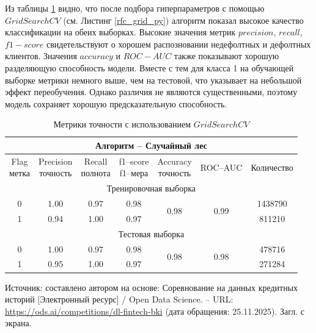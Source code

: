 Из таблицы \ref{new_rfc_gs} видно, что после подбора гиперпараметров с помощью $GridSearchCV$ (см. Листинг \ref{rfc_grid_py}) алгоритм показал высокое качество классификации на обеих выборках. Высокие значения метрик $precision$, $recall$, $f1-score$ свидетельствуют о хорошем распозновании недефолтных и дефолтных клиентов. Значения $accuracy$ и $ROC-AUC$ также показывают хорошую разделяющую способность модели. Вместе с тем для класса 1 на обучающей выборке метрики немного выше, чем на тестовой, что указывает на небольшой эффект переобучения. Однако различия не являются существенными, поэтому модель сохраняет хорошую предсказательную способность.

\begin{center}
	\begin{longtable}{|c|c|c|c|c|c|c|}
		\caption{Метрики точности с использованием $GridSearchCV$}
		\label{new_rfc_gs} \\
		\hline
		\multicolumn{7}{|c|}{Алгоритм -- Случайный лес}\\
		\hline
		\rowcolor[gray]{.9}
		\specialcell{Flag\\метка} &
		\specialcell{Precision\\точность} &
		\specialcell{Recall\\полнота} &
		\specialcell{f1--score\\f1--мера} &
		\specialcell{Accuracy\\точность}  &
		ROC--AUC &
		Количество    \\
		\hline
		\multicolumn{7}{|c|}{Тренировочная выборка}\\
		\hline
		0 & 1.00 & 0.97 & 0.98 &
		\multirow{2}{*}{0.98} &   
		\multirow{2}{*}{0.99} &  
		1438790\\                    
		\cline{1-4} \cline{7-7}
		1 & 0.94 & 1.00 & 0.97 &  
		&      & 811210 \\       
		\hline
		\multicolumn{7}{|c|}{Тестовая выборка} \\
		\hline
		0 & 1.00 & 0.97 & 0.98 &
		\multirow{2}{*}{0.98} &
		\multirow{2}{*}{0.98} &
		478716 \\
		\cline{1-4} \cline{7-7}
		1 & 0.95 & 1.00 & 0.97 & & & 271284 \\
		\hline
	\end{longtable}
	\begin{minipage}{\textwidth}
		\fontsize{9}{11}\selectfont
		\justifying
		Источник: составлено автором на основе: Соревнование на данных кредитных историй [Электронный ресурс] / Open Data Science. -- URL: \url{https://ods.ai/competitions/dl-fintech-bki} (дата обращения: 25.11.2025). Загл. с экрана.
	\end{minipage}
\end{center}

